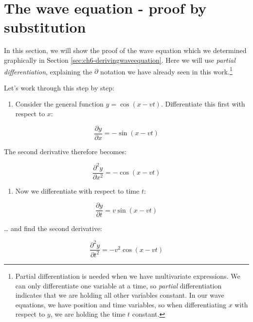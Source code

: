 \documentclass[
]{book}
\providecommand{\tightlist}{%
  \setlength{\itemsep}{0pt}\setlength{\parskip}{0pt}}
\begin{document}
\hypertarget{sec:ch6-waveequationproof2}{%
\section{The wave equation - proof by substitution}\label{sec:ch6-waveequationproof2}}

In this section, we will show the proof of the wave equation which we determined graphically in Section \ref{sec:ch6-derivingwaveequation}. Here we will use \emph{partial differentiation}, explaining the \(\partial\) notation we have already seen in this work.\footnote{Partial differentiation is needed when we have multivariate expressions. We can only differentiate one variable at a time, so \emph{partial} differentiation indicates that we are holding all other variables constant. In our wave equations, we have position and time variables, so when differentiating \(x\) with respect to \(y\), we are holding the time \(t\) constant.}

Let's work through this step by step:

\begin{enumerate}
\def\labelenumi{\arabic{enumi}.}
\tightlist
\item
  Consider the general function \(y = \cos(x - vt)\). Differentiate this first with respect to \(x\):
\end{enumerate}

\begin{equation}
\frac{\partial y}{\partial x} = -\sin(x - vt)
\end{equation}

The second derivative therefore becomes:

\begin{equation}
\frac{\partial^2 y}{\partial x^2} = -\cos(x - vt)
\label{eq:ch6-wavederivsubs1}
\end{equation}

\begin{enumerate}
\def\labelenumi{\arabic{enumi}.}
\setcounter{enumi}{1}
\tightlist
\item
  Now we differentiate with respect to time \(t\):
\end{enumerate}

\begin{equation}
\frac{\partial y}{\partial t} = v\sin(x - vt)
\end{equation}

\ldots{} and find the second derivative:

\begin{equation}
\frac{\partial^2 y}{\partial t^2} = -v^2 \cos(x - vt)
\label{eq:ch6-wavederivsubs2}
\end{equation}
\end{document}
